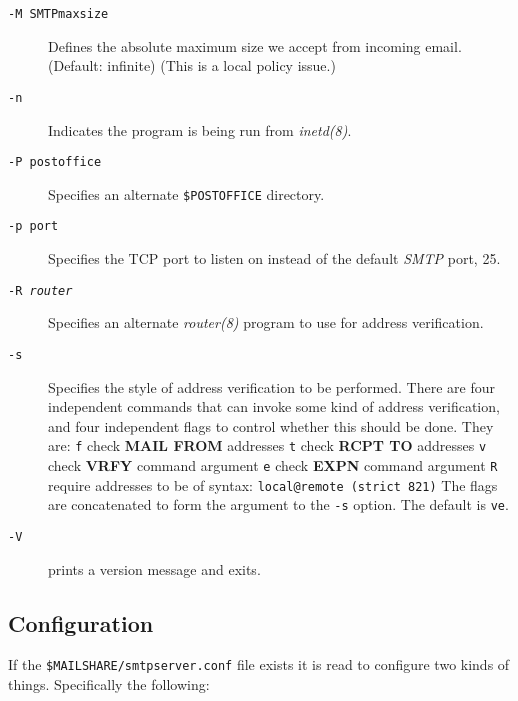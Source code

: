 \begin{description}
\item[{\tt -M SMTPmaxsize}] \mbox{}

Defines the absolute maximum size we accept from incoming email. 
(Default: infinite) (This is a local policy issue.)

\item[{\tt -n}] \mbox{}

Indicates the program is being run from {\em inetd(8)\/}.

\item[{\tt -P postoffice}] \mbox{}

Specifies an alternate {\tt \$POSTOFFICE} directory.

\item[{\tt -p port}] \mbox{}

Specifies the TCP port to listen on instead of the default {\em SMTP\/} port, 25.

\item[{\tt -R {\em router\/}}] \mbox{}

Specifies an alternate {\em router(8)\/} program to use for address verification.

\item[{\tt -s}] \mbox{}

Specifies the style of address verification to be performed. There are four independent commands 
that can invoke some kind of address verification, and four independent flags to control whether this should be done. 
They are:
{\tt f} check {\bf MAIL FROM} addresses
{\tt t} check {\bf RCPT TO} addresses
{\tt v} check {\bf VRFY} command argument
{\tt e} check {\bf EXPN} command argument
{\tt R} require addresses to be of syntax: {\tt local@remote (strict 821)}
The flags are concatenated to form the argument to the {\tt -s} option. 
The default is {\tt ve}.

\item[{\tt -V}] \mbox{}

prints a version message and exits.

\end{description}





\subsection{Configuration}



If the {\tt \$MAILSHARE/smtpserver.conf} file exists it is read 
to configure two kinds of things. Specifically the following:

